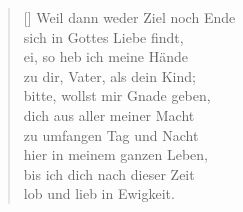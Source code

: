 \begin{multicols}{2}
\begin{verse}[\versewidth]
 Weil dann weder Ziel noch Ende\\
sich in Gottes Liebe findt,\\
ei, so heb ich meine Hände\\
zu dir, Vater, als dein Kind;\\
bitte, wollst mir Gnade geben,\\
dich aus aller meiner Macht\\
zu umfangen Tag und Nacht\\
hier in meinem ganzen Leben,\\
bis ich dich nach dieser Zeit\\
lob und lieb in Ewigkeit.

\end{verse}
\end{multicols}
